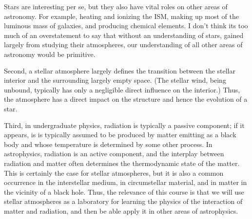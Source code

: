 Stars are interesting per se, but they also have vital roles on other areas of astronomy. For example, heating and ionizing the ISM, making up most of the luminous mass of galaxies, and producing chemical elements. I don't think its too much of an overstatement to say that without an understanding of stars, gained largely from studying their atmospheres, our understanding of all other areas of astronomy would be primitive.

\newslide

Second, a stellar atmosphere largely defines the transition between the stellar interior and the surrounding largely empty space. (The stellar wind, being unbound, typically has only a negligible direct influence on the interior.) Thus, the atmosphere has a direct impact on the structure and hence the evolution of a star.

\newslide

Third, in undergraduate physics, radiation is typically a passive component; if it appears, is is typically assumed to be produced by matter emitting as a black body and whose temperature is determined by some other process. In astrophysics, radiation is an active component, and the interplay between radiation and matter often determines the thermodynamic state of the matter. This is certainly the case for stellar atmospheres, but it is also a common occurrence in the interstellar medium, in circumstellar material, and in matter in the vicinity of a black hole.  Thus, the relevance of this course is that we will use stellar atmospheres as a laboratory for learning the physics of the interaction of matter and radiation, and then be able apply it in other areas of astrophysics.

